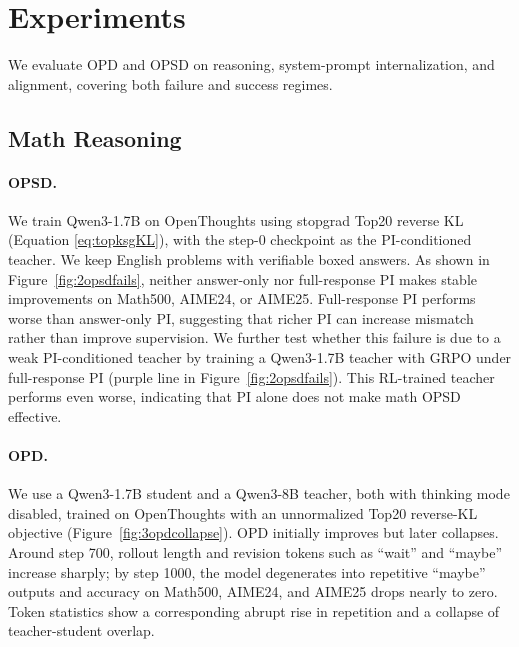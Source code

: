 \section{Experiments}


We evaluate OPD and OPSD on reasoning, system-prompt internalization, and alignment, covering both failure and success regimes.

\subsection{Math Reasoning}



\paragraph{OPSD.}

We train Qwen3-1.7B on OpenThoughts using stopgrad Top20 reverse KL (Equation \ref{eq:topksgKL}), with the step-0 checkpoint as the PI-conditioned teacher. We keep English problems with verifiable boxed answers. As shown in Figure~\ref{fig:2opsdfails}, neither answer-only nor full-response PI makes stable improvements on Math500, AIME24, or AIME25. Full-response PI performs worse than answer-only
PI, suggesting that richer PI can increase mismatch rather than improve
supervision. We further test whether this failure is due to a weak
PI-conditioned teacher by training a Qwen3-1.7B teacher with GRPO under
full-response PI (purple line in Figure~\ref{fig:2opsdfails}). This RL-trained teacher performs even worse, indicating that
PI alone does not make math OPSD effective.





\paragraph{OPD.}We use a Qwen3-1.7B student and a Qwen3-8B teacher, both with thinking mode disabled, trained on OpenThoughts with an unnormalized Top20 reverse-KL objective (Figure~\ref{fig:3opdcollapse}). OPD initially improves but later collapses. Around step 700, rollout length and revision tokens such as ``wait'' and ``maybe'' increase sharply; by step 1000, the model degenerates into repetitive ``maybe'' outputs and accuracy on Math500, AIME24, and AIME25 drops nearly to zero. Token statistics show a corresponding abrupt rise in repetition and a collapse of teacher-student
overlap.


